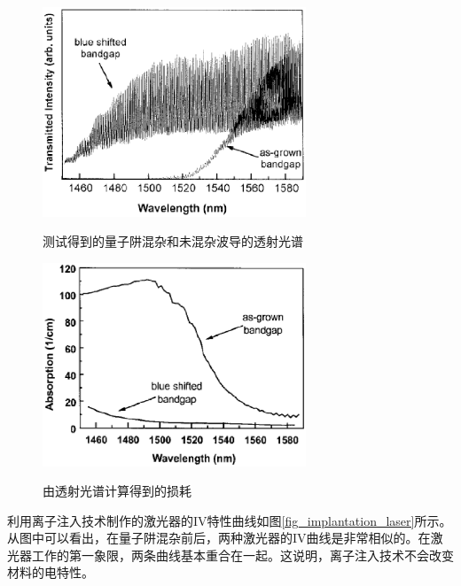 \documentclass[oneside]{ZJUthesis}
\begin{document}
\begin{figure}[!h]
  \centering
  \includegraphics[width=0.7\textwidth]{./Pictures/implantation_wg_test.eps}\\
  \caption{测试得到的量子阱混杂和未混杂波导的透射光谱}
  \label{fig_implantation_wg_test}
\end{figure}

\begin{figure}[!h]
  \centering
  \includegraphics[width=0.7\textwidth]{./Pictures/implantation_wg_loss.eps}\\
  \caption{由透射光谱计算得到的损耗}
  \label{fig_implantation_wg_loss}
\end{figure}

利用离子注入技术制作的激光器的IV特性曲线如图\ref{fig_implantation_laser}所示。从图中可以看出，在量子阱混杂前后，两种激光器的IV曲线是非常相似的。在激光器工作的第一象限，两条曲线基本重合在一起。这说明，离子注入技术不会改变材料的电特性。
\end{document}
